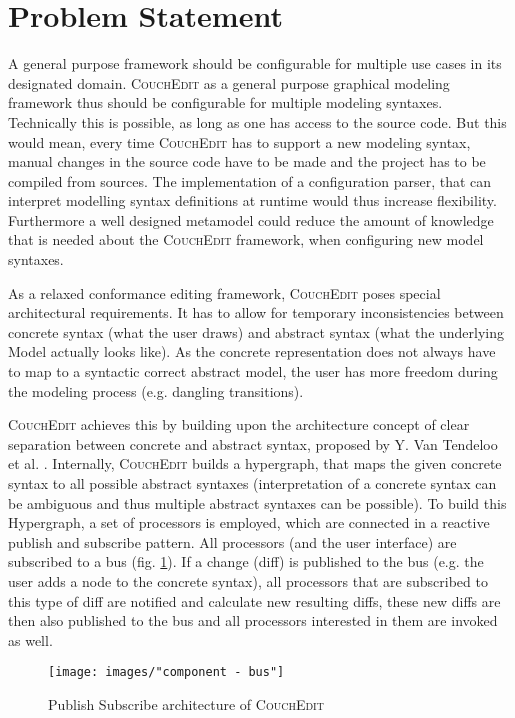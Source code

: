\section{Problem Statement}
\label{sec:problem_statement}

A general purpose framework should be configurable for multiple use cases in its designated domain. \textsc{CouchEdit} as a general purpose graphical modeling framework thus should be configurable for multiple modeling syntaxes. Technically this is possible, as long as one has access to the source code. But this would mean, every time \textsc{CouchEdit} has to support a new modeling syntax, manual changes in the source code have to be made and the project has to be compiled from sources. The implementation of a configuration parser, that can interpret modelling syntax definitions at runtime would thus increase flexibility. Furthermore a well designed metamodel could reduce the amount of knowledge that is needed about the \textsc{CouchEdit} framework, when configuring new model syntaxes.

As a relaxed conformance editing framework, \textsc{CouchEdit} poses special architectural requirements. It has to allow for temporary inconsistencies between concrete syntax (what the user draws) and abstract syntax (what the underlying Model actually looks like). As the concrete representation does not always have to map to a syntactic correct abstract model, the user has more freedom during the modeling process (e.g. dangling transitions).

\textsc{CouchEdit} achieves this by building upon the architecture concept of clear separation between concrete and abstract syntax, proposed by Y. Van Tendeloo et al. \cite{van_tendeloo_concrete_2017}. Internally, \textsc{CouchEdit} builds a hypergraph, that maps the given concrete syntax to all possible abstract syntaxes (interpretation of a concrete syntax can be ambiguous and thus multiple abstract syntaxes can be possible). To build this Hypergraph, a set of processors is employed, which are connected in a reactive publish and subscribe pattern. All processors (and the user interface) are subscribed to a bus (fig. \ref{fig:processors}). If a change (diff) is published to the bus (e.g. the user adds a node to the concrete syntax), all processors that are subscribed to this type of diff are notified and calculate new resulting diffs, these new diffs are then also published to the bus and all processors interested in them are invoked as well.

\begin{figure}
  \centering
  \texttt{[image: images/"component - bus"]}
  \caption{Publish Subscribe architecture of \textsc{CouchEdit}}
  \label{fig:processors}
\end{figure}

